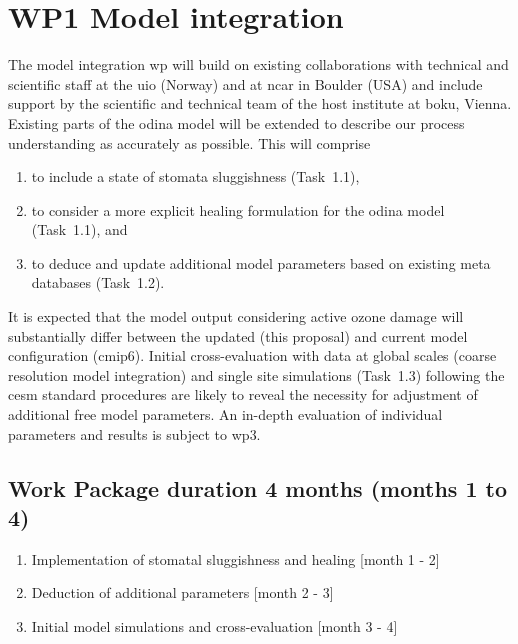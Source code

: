 \section{WP1 Model integration}
\label{sec:wp1}
The model integration \gls{wp} will build on existing collaborations with technical and scientific staff at the \gls{uio} (Norway) and at \gls{ncar} in Boulder (USA) and include support by the scientific and technical team of the host institute at \gls{boku}, Vienna. Existing parts of the \gls{odina} model will be extended to describe our process understanding as accurately as possible. This will comprise
\begin{enumerate}
  \itemsep0pt
\item to include a state of stomata sluggishness (Task~1.1),
\item to consider a more explicit healing formulation for the \gls{odina} model (Task~1.1), and
\item to deduce and update additional model parameters based on existing meta databases (Task~1.2).
\end{enumerate}
It is expected that the model output considering active ozone damage will substantially differ between the updated (this proposal) and current model configuration (\gls{cmip}6). Initial cross-evaluation with data at global scales (coarse resolution model integration) and single site simulations (Task~1.3) following the \gls{cesm} standard procedures are likely to reveal the necessity for adjustment of additional free model parameters. An in-depth evaluation of individual parameters and results is subject to \gls{wp}3. %
{
\subsection*{Work Package duration 4 months (months 1 to 4)}
\begin{enumerate}[start=1,label={T1.\arabic*}]
  \itemsep0pt
\item Implementation of stomatal sluggishness and healing \hfill [month 1 - 2]
\item Deduction of additional parameters \hfill [month 2 - 3]
\item Initial model simulations and cross-evaluation \hfill [month 3 - 4]
\end{enumerate}
}

